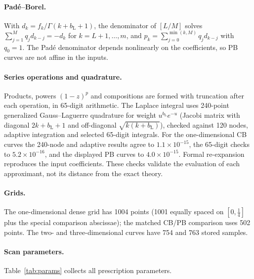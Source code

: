 \documentclass[11pt,a4paper]{article}
\numberwithin{equation}{section}
\newcommand{\bL}{b_{\mathrm L}}
\newcommand{\sci}[2]{#1\times10^{#2}}
\begin{document}
\paragraph{Pad\'e--Borel.} With $d_k=f_k/\Gamma(k+\bL+1)$, the denominator of $[L/M]$ solves
$\sum_{j=1}^Mq_jd_{k-j}=-d_k$ for $k=L+1,\dots,m$, and $p_k=\sum_{j=0}^{\min(k,M)}q_jd_{k-j}$
with $q_0=1$. The Pad\'e denominator depends nonlinearly on the coefficients, so PB curves are
not affine in the inputs.

\paragraph{Series operations and quadrature.} Products, powers $(1-z)^p$ and compositions are
formed with truncation after each operation, in 65-digit arithmetic. The Laplace integral uses
240-point generalized Gauss--Laguerre quadrature for weight $u^{\bL}e^{-u}$ (Jacobi matrix with
diagonal $2k+\bL+1$ and off-diagonal $\sqrt{k(k+\bL)}$), checked against 120 nodes, adaptive
integration and selected 65-digit integrals. For the one-dimensional CB curves the 240-node and
adaptive results agree to $\sci{1.1}{-15}$, the 65-digit checks to $\sci{5.2}{-16}$, and the
displayed PB curves to $\sci{4.0}{-15}$. Formal re-expansion reproduces the input coefficients.
These checks validate the evaluation of each approximant, not its distance from the exact theory.

\paragraph{Grids.} The one-dimensional dense grid has 1004 points (1001 equally spaced on
$[0,\frac14]$ plus the special comparison abscissae); the matched CB/PB comparison uses 502
points. The two- and three-dimensional curves have 754 and 763 stored samples.

\paragraph{Scan parameters.} Table~\ref{tab:params} collects all prescription parameters.
\end{document}

